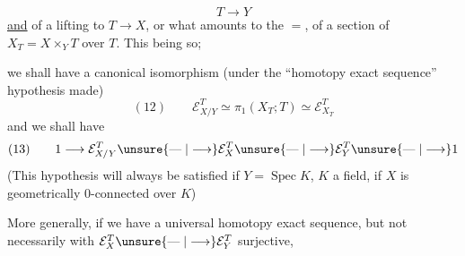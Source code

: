 
\[
T\longrightarrow Y
\]
\uline{and} of a lifting to $T\longrightarrow X$, or what amounts to the $=$, of a section of $X_T=X\times_YT$ over $T$. This being so;


we shall have a canonical isomorphism (under the ``homotopy exact sequence'' hypothesis made)
\[
(12)\qquad \mathcal E_{X/Y}^T\simeq\pi_1(X_T;T)\simeq\mathcal E_{X_T}^T
\]
and we shall have
\[
(13)\qquad 1\longrightarrow\mathcal E_{X/Y}^T\unsure{\mathrel{\text{---}}|\longrightarrow}\mathcal E_X^T\unsure{\mathrel{\text{---}}|\longrightarrow}\mathcal E_Y^T\unsure{\mathrel{\text{---}}|\longrightarrow}1
\]
(This hypothesis will always be satisfied if $Y=\operatorname{Spec}K$, $K$ a field, if $X$ is geometrically $0$-connected over $K$)

More generally, if we have a universal homotopy exact sequence, but not necessarily with $\mathcal E_X^T\unsure{\mathrel{\text{---}}|\longrightarrow}\mathcal E_Y^T$ surjective,

